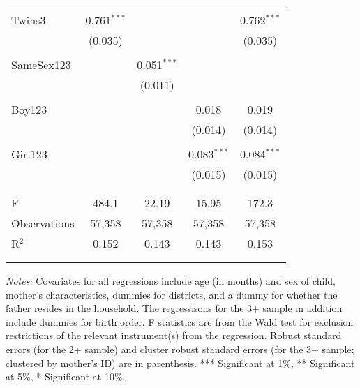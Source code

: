 \begin{wraptable}{l}{10.5cm}
\begin{threeparttable}
\begin{tabular}{@{\extracolsep{5pt}}lcccc}
 \\
 \\[-1.5ex]
 Twins3 & 0.761$^{***}$ &  &  & 0.762$^{***}$ \\ 
  & (0.035) &  &  & (0.035) \\ 
  & & & & \\ 
 SameSex123 &  & 0.051$^{***}$ &  &  \\ 
  &  & (0.011) &  &  \\ 
  & & & & \\ 
 Boy123 &  &  & 0.018 & 0.019 \\ 
  &  &  & (0.014) & (0.014) \\ 
  & & & & \\ 
 Girl123 &  &  & 0.083$^{***}$ & 0.084$^{***}$ \\ 
  &  &  & (0.015) & (0.015) \\ 
  & & & & \\ 
\cline{2-5} \\[-2.0ex]
F & 484.1 & 22.19 & 15.95 & 172.3 \\ 
Observations & 57,358 & 57,358 & 57,358 & 57,358 \\ 
R$^{2}$ & 0.152 & 0.143 & 0.143 & 0.153 \\ 
\\[-2.0ex]
\hline 
\hline \\[-1.8ex] 
\end{tabular} 
\begin{tablenotes}
\footnotesize
\item \textit{Notes:} Covariates for all regressions include age (in months) and sex of child, 
mother's characteristics, dummies for districts, and a dummy for whether the father resides in the household.
The regressisons for the 3+ sample in addition include dummies for birth order. F statistics are from the Wald 
test for exclusion restrictions of the relevant instrument(s) from the regression. Robust standard errors 
(for the 2+ sample) and cluster robust standard errors (for the 3+ sample; clustered by mother's ID) are in parenthesis. 
*** Significant at 1\%, ** Significant at 5\%, * Significant at 10\%.
\end{tablenotes}
\end{threeparttable}
\end{wraptable} 




